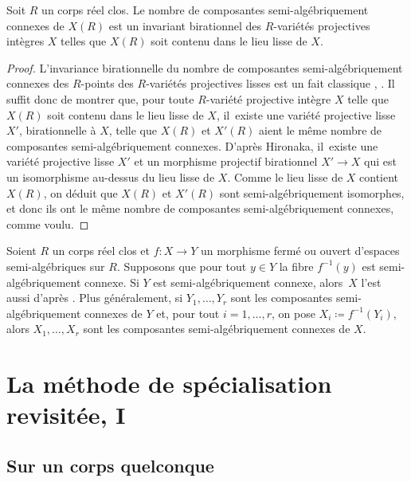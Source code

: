 \begin{lemma}\label{connexe-invariant}
Soit $R$ un corps réel clos. Le nombre de composantes semi-algébri\-quement connexes de $X(R)$ est un invariant birationnel des $R$-variétés projectives intègres $X$ telles que $X(R)$ soit contenu dans le lieu lisse de $X$.
\end{lemma}

\begin{proof}
L'invariance birationnelle du nombre de composantes semi-algé\-briquement connexes des $R$-points des $R$-variétés projectives lisses est un fait classique \cite[\S 13]{delfs1981semialgebraicII}, \cite[Th.\,3.4.12]{bochnak1998real}. Il suffit donc de montrer que, pour toute $R$-variété projective intègre $X$ telle que $X(R)$ soit contenu dans le lieu lisse de $X$, il~existe une variété projective lisse $X'$, birationnelle à $X$, telle que $X(R)$ et $X'(R)$ aient le même nombre de composantes semi-algébriquement connexes. D'après Hironaka, il~existe une variété projective lisse $X'$ et un morphisme projectif birationnel $X'\to X$ qui est un isomorphisme au-dessus du lieu lisse de $X$. Comme le lieu lisse de $X$ contient $X(R)$, on déduit que $X(R)$ et $X'(R)$ sont semi-algébriquement isomorphes, et donc ils ont le même nombre de composantes semi-algébriquement connexes, comme voulu.
\end{proof}

\begin{rmk}\label{fibres-connexes}
Soient $R$ un corps réel clos et $f\colon X\to Y$ un morphisme fermé ou ouvert d'espaces semi-algébriques sur $R$. Supposons que pour tout $y\in Y$ la fibre $f^{-1}(y)$ est semi-algébriquement connexe. Si $Y$ est semi-algébriquement connexe, alors~$X$ l'est aussi d'après \cite[Exer.\,4.4.1(a)]{scheiderer2024course}. Plus généralement, si $Y_1,\dots,Y_r$ sont les composantes semi-algébriquement connexes de $Y$ et, pour tout $i=1,\dots,r$, on pose $X_i\coloneqq f^{-1}(Y_i)$, alors $X_1,\dots,X_r$ sont les composantes semi-algébriquement connexes de $X$.
\end{rmk}

\section{La méthode de spécialisation revisitée, I}
\label{parasp}

\subsection{Sur un corps quelconque}


